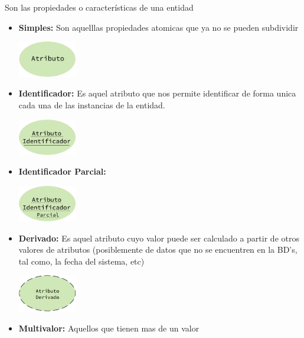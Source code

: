 \documentclass[12pt, fleqn]{report}                             %
\theoremstyle{break}                                            %
\begin{document}
            Son las propiedades o características de una entidad
            \begin{itemize}

                \item \textbf{Simples:}
                    Son aquelllas propiedades atomicas que ya no se pueden subdividir
                    
                    \includegraphics[width=0.20\textwidth]{Atributo}

                \item \textbf{Identificador:}
                    Es aquel atributo que nos permite identificar de forma unica cada una de las
                    instancias de la entidad.

                    \includegraphics[width=0.20\textwidth]{AtributoID}

                \item \textbf{Identificador Parcial:}

                    \includegraphics[width=0.20\textwidth]{AtributoIDParcial}

                \item \textbf{Derivado:}
                    Es aquel atributo cuyo valor puede ser calculado a partir de
                    otros valores de atributos (posiblemente de datos que no se
                    encuentren en la BD's, tal como, la fecha del sistema, etc)

                    \includegraphics[width=0.20\textwidth]{AtributoDerivado}

                \item \textbf{Multivalor:}
                    Aquellos que tienen mas de un valor


\end{itemize}
\end{document}
